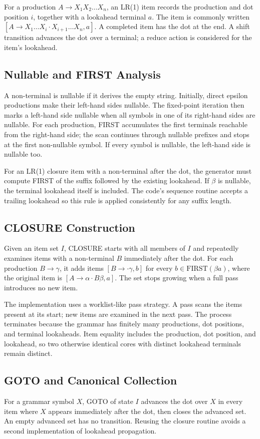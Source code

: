 \documentclass[12pt,a4paper,oneside]{report}
\begin{document}
For a production $A\to X_1X_2\ldots X_n$, an LR(1) item records the production and dot position $i$, together with a lookahead terminal $a$. The item is commonly written $[A\to X_1\ldots X_i\cdot X_{i+1}\ldots X_n,a]$. A completed item has the dot at the end. A shift transition advances the dot over a terminal; a reduce action is considered for the item's lookahead.

\subsection{Nullable and FIRST Analysis}
A non-terminal is nullable if it derives the empty string. Initially, direct epsilon productions make their left-hand sides nullable. The fixed-point iteration then marks a left-hand side nullable when all symbols in one of its right-hand sides are nullable. For each production, FIRST accumulates the first terminals reachable from the right-hand side; the scan continues through nullable prefixes and stops at the first non-nullable symbol. If every symbol is nullable, the left-hand side is nullable too.

For an LR(1) closure item with a non-terminal after the dot, the generator must compute FIRST of the suffix followed by the existing lookahead. If $\beta$ is nullable, the terminal lookahead itself is included. The code's sequence routine accepts a trailing lookahead so this rule is applied consistently for any suffix length.

\subsection{CLOSURE Construction}
Given an item set $I$, CLOSURE starts with all members of $I$ and repeatedly examines items with a non-terminal $B$ immediately after the dot. For each production $B\to\gamma$, it adds items $[B\to\cdot\gamma,b]$ for every $b\in\mathrm{FIRST}(\beta a)$, where the original item is $[A\to\alpha\cdot B\beta,a]$. The set stops growing when a full pass introduces no new item.

The implementation uses a worklist-like pass strategy. A pass scans the items present at its start; new items are examined in the next pass. The process terminates because the grammar has finitely many productions, dot positions, and terminal lookaheads. Item equality includes the production, dot position, and lookahead, so two otherwise identical cores with distinct lookahead terminals remain distinct.

\subsection{GOTO and Canonical Collection}
For a grammar symbol $X$, GOTO of state $I$ advances the dot over $X$ in every item where $X$ appears immediately after the dot, then closes the advanced set. An empty advanced set has no transition. Reusing the closure routine avoids a second implementation of lookahead propagation.
\end{document}
